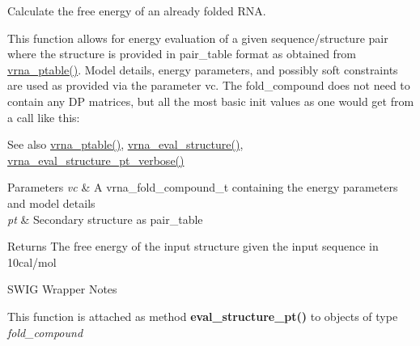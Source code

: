 Calculate the free energy of an already folded R\+NA. 

This function allows for energy evaluation of a given sequence/structure pair where the structure is provided in pair\+\_\+table format as obtained from \mbox{\hyperlink{group__struct__utils__pair__table_gae829fb8bb7f694c12a9c0bbc34c77c60}{vrna\+\_\+ptable()}}. Model details, energy parameters, and possibly soft constraints are used as provided via the parameter \textquotesingle{}vc\textquotesingle{}. The fold\+\_\+compound does not need to contain any DP matrices, but all the most basic init values as one would get from a call like this\+: 
\begin{DoxyCode}{0}
\end{DoxyCode}


\begin{DoxySeeAlso}{See also}
\mbox{\hyperlink{group__struct__utils__pair__table_gae829fb8bb7f694c12a9c0bbc34c77c60}{vrna\+\_\+ptable()}}, \mbox{\hyperlink{group__eval_ga58f199f1438d794a265f3b27fc8ea631}{vrna\+\_\+eval\+\_\+structure()}}, \mbox{\hyperlink{group__eval_ga8a517cfeeae8c376ae7b1e0c401d38b4}{vrna\+\_\+eval\+\_\+structure\+\_\+pt\+\_\+verbose()}}
\end{DoxySeeAlso}

\begin{DoxyParams}{Parameters}
{\em vc} & A vrna\+\_\+fold\+\_\+compound\+\_\+t containing the energy parameters and model details \\
\hline
{\em pt} & Secondary structure as pair\+\_\+table \\
\hline
\end{DoxyParams}
\begin{DoxyReturn}{Returns}
The free energy of the input structure given the input sequence in 10cal/mol
\end{DoxyReturn}
\begin{DoxyRefDesc}{S\+W\+I\+G Wrapper Notes}
\item[\mbox{\hyperlink{wrappers__wrappers000044}{S\+W\+I\+G Wrapper Notes}}]This function is attached as method {\bfseries{eval\+\_\+structure\+\_\+pt()}} to objects of type {\itshape fold\+\_\+compound} \end{DoxyRefDesc}
\mbox{\label{group__eval_ga8a517cfeeae8c376ae7b1e0c401d38b4}} 
